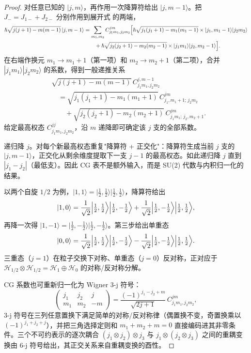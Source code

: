 \begin{proof}
对任意已知的 $|j,m\rangle$，再作用一次降算符给出 $|j,m-1\rangle$。把 $J_-=J_{1-}+J_{2-}$ 分别作用到展开式  的两端，
\begin{align*}
 \hbar\sqrt{j(j+1)-m(m-1)}\,|j,m-1\rangle
 &=\sum_{m_1,m_2}C^{jm}_{j_1m_1,j_2m_2}
 \Bigl[
 \hbar\sqrt{j_1(j_1+1)-m_1(m_1-1)}
 \times|j_1,m_1-1\rangle|j_2m_2\rangle
 \\
 &\qquad+\hbar\sqrt{j_2(j_2+1)-m_2(m_2-1)}
 \times|j_1m_1\rangle|j_2,m_2-1\rangle
 \Bigr].
\end{align*}
在右端作换元 $m_1\to m_1+1$（第一项）和 $m_2\to m_2+1$（第二项），合并 $|j_1m_1\rangle|j_2m_2\rangle$ 的系数，得到一般递推关系
\begin{align*}
 &\sqrt{j(j+1)-m(m-1)}\,
 C^{j,m-1}_{j_1m_1,j_2m_2}
 \\
 &\quad=\sqrt{j_1(j_1+1)-m_1(m_1+1)}\,
 C^{jm}_{j_1,m_1+1;\,j_2m_2}
 \\
 &\qquad{}+\sqrt{j_2(j_2+1)-m_2(m_2+1)}\,
 C^{jm}_{j_1m_1;\,j_2,m_2+1}.
\end{align*}
给定最高权态 $C^{jj}_{j_1m_1,j_2m_2}$，沿 $m$ 递降即可确定该 $j$ 支的全部系数。

递归降 $j$。对每个新最高权态重复"降算符 + 正交化"：降算符生成当前 $j$ 支的 $|j,m-1\rangle$，正交化从剩余维度提取下一支 $j-1$ 的最高权态。如此递归降 $j$ 直到 $|j_1-j_2|$（最低支）。因此 CG 表不是额外输入，而是 SU(2) 代数与内积归一化的结果。

以两个自旋 $1/2$ 为例，$|1,1\rangle=|\tfrac12,\tfrac12\rangle|\tfrac12,\tfrac12\rangle$，降算符给出
\begin{equation*}
 |1,0\rangle=\frac1{\sqrt2}\Bigl|\tfrac12,\tfrac12\Bigr\rangle\Bigl|\tfrac12,-\tfrac12\Bigr\rangle
 +\frac1{\sqrt2}\Bigl|\tfrac12,-\tfrac12\Bigr\rangle\Bigl|\tfrac12,\tfrac12\Bigr\rangle,
\end{equation*}
再降一次得 $|1,-1\rangle=|\tfrac12,-\tfrac12\rangle|\tfrac12,-\tfrac12\rangle$。第三步给出单重态
\begin{equation*}
 |0,0\rangle=\frac1{\sqrt2}\Bigl|\tfrac12,\tfrac12\Bigr\rangle\Bigl|\tfrac12,-\tfrac12\Bigr\rangle
 -\frac1{\sqrt2}\Bigl|\tfrac12,-\tfrac12\Bigr\rangle\Bigl|\tfrac12,\tfrac12\Bigr\rangle.
\end{equation*}
三重态（$j=1$）在粒子交换下对称、单重态（$j=0$）反对称，正对应于 $\mathcal H_{1/2}\otimes\mathcal H_{1/2}=\mathcal H_1\oplus\mathcal H_0$ 的对称/反对称分解。

CG 系数也可重新归一化为 Wigner 3-j 符号：
\begin{equation*}
  \begin{pmatrix}j_1&j_2&j\\m_1&m_2&-m\end{pmatrix}
  =\frac{(-1)^{j_1-j_2+m}}{\sqrt{2j+1}}\,C^{jm}_{j_1m_1,j_2m_2},
\end{equation*}
3-j 符号在三列任意置换下满足简单的对称/反对称律（偶置换不变，奇置换乘以 $(-1)^{j_1+j_2+j}$），并把三角选择定则和 $m_1+m_2+m=0$ 直接编码进其非零条件。三个不可约表示的逐次耦合 $(j_1\otimes j_2)\otimes j_3$ 与 $j_1\otimes(j_2\otimes j_3)$ 之间的重耦变换由 6-j 符号给出，其正交关系来自重耦变换的酉性。
\end{proof}

